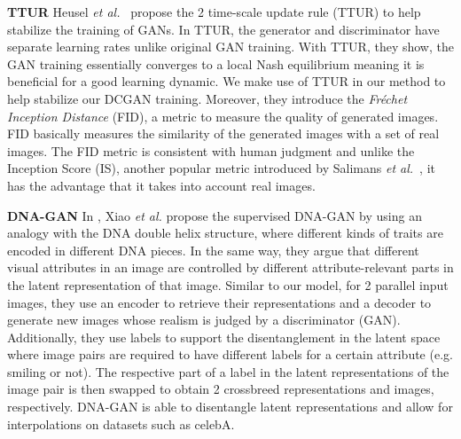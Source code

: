 \documentclass[a4paper,12pt]{report}
\begin{document}
\par \textbf{TTUR} Heusel \textit{et al.}~\cite{TTUR} propose the 2 time-scale
update rule (TTUR) to help stabilize the training of GANs. In TTUR, the generator and discriminator have separate learning rates unlike original GAN training. With TTUR, they show, the GAN training essentially converges to a local Nash equilibrium meaning it is beneficial for a good learning dynamic. We make use of TTUR in our method to help stabilize our DCGAN training. Moreover, they introduce the \textit{Fréchet Inception Distance} (FID), a metric to measure the quality of generated images. FID basically measures the similarity of the generated images with a set of real images. The FID metric is consistent with human judgment and unlike the Inception Score (IS), another popular metric introduced by Salimans \textit{et al.}~\cite{ImprTechn4TrainGANs}, it has the advantage that it takes into account real images.

\par \textbf{DNA-GAN} In \cite{DnaGan}, Xiao \textit{et al.} propose the supervised DNA-GAN by using an analogy with the DNA double helix structure, where different kinds of traits are encoded in different DNA pieces. In the same way, they argue that different visual attributes in an image are controlled by different attribute-relevant parts in the latent representation of that image. Similar to our model, for 2 parallel input images, they use an encoder to retrieve their representations and a decoder to generate new images whose realism is judged by a discriminator (GAN). Additionally, they use labels to support the disentanglement in the latent space where image pairs are required to have different labels for a certain attribute (e.g. smiling or not). The respective part of a label in the latent representations of the image pair is then swapped to obtain 2 crossbreed representations and images, respectively. DNA-GAN is able to disentangle latent representations and allow for interpolations on datasets such as celebA.
\end{document}
